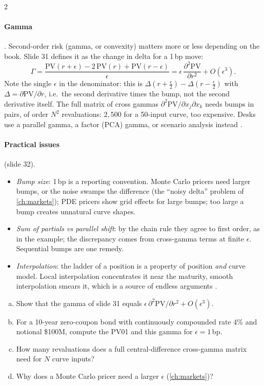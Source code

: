 \begin{paracol}{2}
\paragraph{Gamma} . Second-order risk (gamma, or convexity) matters more or less depending on the
book. Slide 31 defines it as the change in delta for a 1\,bp move:
\[
  \Gamma=\frac{\mathrm{PV}(r+\epsilon)-2\,\mathrm{PV}(r)+\mathrm{PV}(r-\epsilon)}{\epsilon}
  =\epsilon\,\frac{\partial^2\mathrm{PV}}{\partial r^2}+O(\epsilon^3).
\]
Note the single $\epsilon$ in the denominator: this is $\Delta(r+\tfrac\epsilon2)-\Delta(r-\tfrac\epsilon2)$ with
$\Delta=\partial\mathrm{PV}/\partial r$, i.e.\ the second derivative times the bump, not the second derivative
itself. The full matrix of cross gammas $\partial^2\mathrm{PV}/\partial x_j\partial x_k$ needs bumps in pairs, of
order $N^2$ revaluations: $2{,}500$ for a 50-input curve, too expensive. Desks use a parallel gamma, a factor (PCA)
gamma, or scenario analysis instead .

\paragraph{Practical issues}  (slide 32).
\begin{itemize}
  \item \emph{Bump size}: 1\,bp is a reporting convention. Monte Carlo pricers need larger bumps, or the noise
        swamps the difference (the ``noisy delta'' problem of \cref{ch:markets}); PDE pricers show grid effects
        for large bumps; too large a bump creates unnatural curve shapes.
  \item \emph{Sum of partials vs parallel shift}: by the chain rule they agree to first order, as in the example;
        the discrepancy comes from cross-gamma terms at finite $\epsilon$. Sequential bumps are one remedy.
  \item \emph{Interpolation}: the ladder of a position is a property of position \emph{and} curve model. Local
        interpolation concentrates it near the maturity, smooth interpolation smears it, which is a source of
        endless arguments .
\end{itemize}

\begin{exercise}
\leavevmode
\begin{enumerate}[(a)]
  \item Show that the gamma of slide 31 equals
      $\epsilon\,\partial^2\mathrm{PV}/\partial r^2+O(\epsilon^3)$.
  \item For a 10-year zero-coupon bond with continuously compounded
      rate 4\% and notional \$100M, compute the PV01 and this gamma for
      $\epsilon=1$\,bp.
  \item How many revaluations does a full central-difference
      cross-gamma matrix need for $N$ curve inputs?
  \item Why does a Monte Carlo pricer need a larger $\epsilon$
      (\cref{ch:markets})?
\end{enumerate}
\end{exercise}


\end{paracol}
